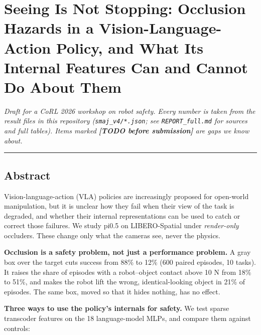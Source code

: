 \documentclass[
  10pt,
]{article}
\author{}
\date{}
\begin{document}
\hypertarget{seeing-is-not-stopping-occlusion-hazards-in-a-vision-language-action-policy-and-what-its-internal-features-can-and-cannot-do-about-them}{%
\section{Seeing Is Not Stopping: Occlusion Hazards in a
Vision-Language-Action Policy, and What Its Internal Features Can and
Cannot Do About
Them}\label{seeing-is-not-stopping-occlusion-hazards-in-a-vision-language-action-policy-and-what-its-internal-features-can-and-cannot-do-about-them}}

\emph{Draft for a CoRL 2026 workshop on robot safety. Every number is
taken from the result files in this repository
(\texttt{smaj\_v4/*.json}; see \texttt{REPORT\_full.md} for sources and
full tables). Items marked \textbf{{[}TODO before submission{]}} are
gaps we know about.}

\begin{center}\rule{0.5\linewidth}{0.5pt}\end{center}

\hypertarget{abstract}{%
\subsection{Abstract}\label{abstract}}

Vision-language-action (VLA) policies are increasingly proposed for
open-world manipulation, but it is unclear how they fail when their view
of the task is degraded, and whether their internal representations can
be used to catch or correct those failures. We study pi0.5 on
LIBERO-Spatial under \emph{render-only} occluders. These change only
what the cameras see, never the physics.

\textbf{Occlusion is a safety problem, not just a performance problem.}
A gray box over the target cuts success from 88\% to 12\% (600 paired
episodes, 10 tasks). It raises the share of episodes with a
robot--object contact above 10 N from 18\% to 51\%, and makes the robot
lift the wrong, identical-looking object in 21\% of episodes. The same
box, moved so that it hides nothing, has no effect.

\textbf{Three ways to use the policy's internals for safety.} We test
sparse transcoder features on the 18 language-model MLPs, and compare
them against controls:
\end{document}
